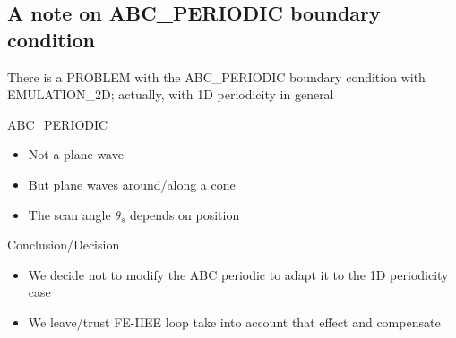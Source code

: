 \subsection{A note on ABC\_PERIODIC boundary condition}

  \begin{frame}

    \vspace{2\baselineskip}
    
    {There is a PROBLEM with the ABC\_PERIODIC boundary condition with
      EMULATION\_2D; actually, with 1D periodicity in general}
    
  \end{frame}
 

  \begin{frame}{ABC\_PERIODIC}
    
  \begin{center}
  \end{center}

  \framebreak %

  \begin{itemize}
  \item Not a plane wave
  \item But plane waves around/along a cone
  \item The scan angle $\theta_s$ depends on position
  \end{itemize}

  \framebreak %

  \begin{alertblock}{Conclusion/Decision}
    \begin{itemize}
    \item We decide not to modify the ABC periodic to adapt it to the
      1D periodicity case
    \item We leave/trust FE-IIEE loop take into account that effect
      and compensate
  \end{itemize}
  \end{alertblock}

  
\end{frame}

